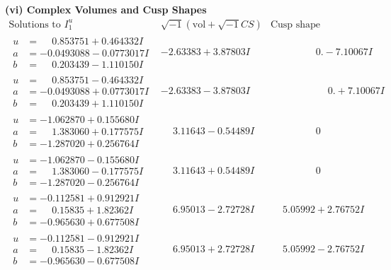 \documentclass[1p]{elsarticle_modified}
\theoremstyle{definition}
\newcommand{\I}{\sqrt{-1}}
\begin{document}
\newpage\flushleft \textbf{(vi) Complex Volumes and Cusp Shapes}
$$\begin{array}{c|c|c}  
\text{Solutions to }I^u_{1}& \I (\text{vol} + \sqrt{-1}CS) & \text{Cusp shape}\\
 \hline 
\begin{aligned}
u &= \phantom{-}0.853751 + 0.464332 I \\
a &= -0.0493088 - 0.0773017 I \\
b &= \phantom{-}0.203439 - 1.110150 I\end{aligned}
 & -2.63383 + 3.87803 I & \phantom{-0.000000 } 0. - 7.10067 I \\ \hline\begin{aligned}
u &= \phantom{-}0.853751 - 0.464332 I \\
a &= -0.0493088 + 0.0773017 I \\
b &= \phantom{-}0.203439 + 1.110150 I\end{aligned}
 & -2.63383 - 3.87803 I & \phantom{-0.000000 -}0. + 7.10067 I \\ \hline\begin{aligned}
u &= -1.062870 + 0.155680 I \\
a &= \phantom{-}1.383060 + 0.177575 I \\
b &= -1.287020 + 0.256764 I\end{aligned}
 & \phantom{-}3.11643 - 0.54489 I & \phantom{-0.000000 } 0 \\ \hline\begin{aligned}
u &= -1.062870 - 0.155680 I \\
a &= \phantom{-}1.383060 - 0.177575 I \\
b &= -1.287020 - 0.256764 I\end{aligned}
 & \phantom{-}3.11643 + 0.54489 I & \phantom{-0.000000 } 0 \\ \hline\begin{aligned}
u &= -0.112581 + 0.912921 I \\
a &= \phantom{-}0.15835 + 1.82362 I \\
b &= -0.965630 + 0.677508 I\end{aligned}
 & \phantom{-}6.95013 - 2.72728 I & \phantom{-}5.05992 + 2.76752 I \\ \hline\begin{aligned}
u &= -0.112581 - 0.912921 I \\
a &= \phantom{-}0.15835 - 1.82362 I \\
b &= -0.965630 - 0.677508 I\end{aligned}
 & \phantom{-}6.95013 + 2.72728 I & \phantom{-}5.05992 - 2.76752 I \\ \hline\begin{aligned}

\end{aligned}
\end{array}$$
\end{document}
